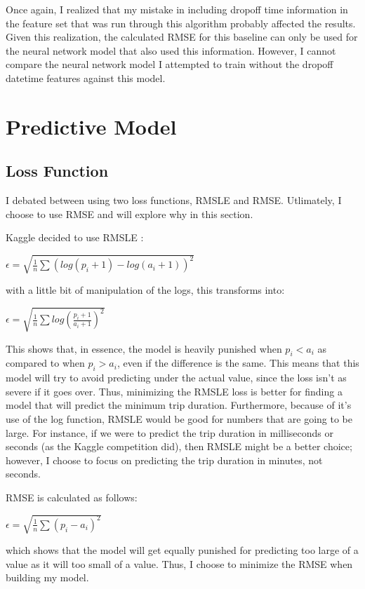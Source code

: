 \documentclass[conference]{IEEEtran}
\begin{document}
Once again, I realized that my mistake in including dropoff time information in the feature set that was run through this algorithm probably affected the results.  Given this realization, the calculated RMSE for this baseline can only be used for the neural network model that also used this information.  However, I cannot compare the neural network model I attempted to train without the dropoff datetime features against this model.

\section{Predictive Model}


\subsection{Loss Function} \label{loss}
I debated between using two loss functions, RMSLE and RMSE.  Utlimately, I choose to use RMSE and will explore why in this section.

Kaggle decided to use RMSLE \cite{kaggle}:

$\epsilon = \sqrt{\frac{1}{n} \sum{(log(p_i + 1) - log(a_i + 1))^2}}$

with a little bit of manipulation of the logs, this transforms into:

$\epsilon = \sqrt{\frac{1}{n} \sum{log(\frac{p_i + 1}{a_i + 1})^2}}$

This shows that, in essence, the model is heavily punished when $p_i < a_i$ as compared to when $p_i > a_i$, even if the difference is the same.  This means that this model will try to avoid predicting under the actual value, since the loss isn't as severe if it goes over.  Thus, minimizing the RMSLE loss is better for finding a model that will predict the minimum trip duration.  Furthermore, because of it's use of the log function, RMSLE would be good for numbers that are going to be large.  For instance, if we were to predict the trip duration in milliseconds or seconds (as the Kaggle competition did), then RMSLE might be a better choice; however, I choose to focus on predicting the trip duration in minutes, not seconds.

RMSE is calculated as follows:

$\epsilon = \sqrt{\frac{1}{n} \sum{(p_i - a_i)^2}}$

which shows that the model will get equally punished for predicting too large of a value as it will too small of a value.  Thus, I choose to minimize the RMSE when building my model.
\end{document}
